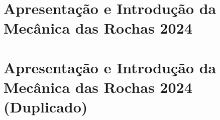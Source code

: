 \documentclass[12pt,a4paper,twoside]{book}
\begin{document}


\section{Apresentação e Introdução da Mecânica das Rochas 2024}



\section{Apresentação e Introdução da Mecânica das Rochas 2024 (Duplicado)}


\end{document}
